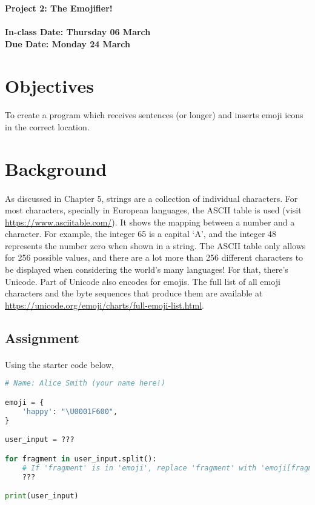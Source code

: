 \documentclass[letter,10pt]{article}
\begin{document}
    
    \huge
    \textbf{Project 2: The Emojifier!}
    \normalsize
    \\ ~~ \\
    \textbf{In-class Date: Thursday 06 March} \\
    \textbf{Due Date: Monday 24 March}
    
    \section*{Objectives}
    \paragraph{}To create a program which receives sentences (or longer) and inserts emoji icons in the correct location.
    
    \section*{Background}
    \paragraph{}As discussed in Chapter 5, strings are a collection of individual characters. For most characters, specially in European languages, the ASCII table is used (visit \url{https://www.asciitable.com/}). It shows the mapping between a number and a character. For example, the integer 65 is a capital `A', and the integer 48 represents the number zero when shown in a string. The ASCII table only allows for 256 possible values, and there are a lot more than 256 different characters to be displayed when considering the world's many languages! For that, there's Unicode. Part of Unicode also encodes for emojis. The full list of all emoji characters and the byte sequences that produce them are available at \url{https://unicode.org/emoji/charts/full-emoji-list.html}.
    
    \subsection*{Assignment}
    \paragraph{}Using the starter code below, 
    
    \begin{lstlisting}[language=python]
# Name: Alice Smith (your name here!)

emoji = {
    'happy': "\U0001F600",
}

user_input = ???

for fragment in user_input.split():
    # If 'fragment' is in 'emoji', replace 'fragment' with 'emoji[fragment]'
    ???

print(user_input)
    \end{lstlisting}
\end{document}
